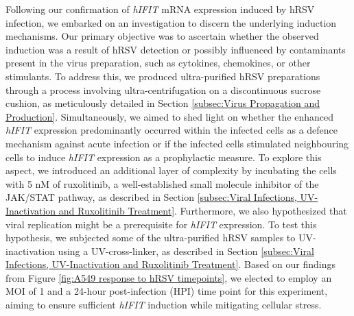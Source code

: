 Following our confirmation of \textit{hIFIT} mRNA expression induced by hRSV infection, we embarked on an investigation to discern the underlying induction mechanisms. Our primary objective was to ascertain whether the observed induction was a result of hRSV detection or possibly influenced by contaminants present in the virus preparation, such as cytokines, chemokines, or other stimulants. To address this, we produced ultra-purified hRSV preparations through a process involving ultra-centrifugation on a discontinuous sucrose cushion, as meticulously detailed in Section \ref{subsec:Virus Propagation and Production}. Simultaneously, we aimed to shed light on whether the enhanced \textit{hIFIT} expression predominantly occurred within the infected cells as a defence mechanism against acute infection or if the infected cells stimulated neighbouring cells to induce \textit{hIFIT} expression as a prophylactic measure. To explore this aspect, we introduced an additional layer of complexity by incubating the cells with 5 nM of ruxolitinib, a well-established small molecule inhibitor of the JAK/STAT pathway, as described in Section \ref{subsec:Viral Infections, UV-Inactivation and Ruxolitinib Treatment}. Furthermore, we also hypothesized that viral replication might be a prerequisite for \textit{hIFIT} expression. To test this hypothesis, we subjected some of the ultra-purified hRSV samples to UV-inactivation using a UV-cross-linker, as described in Section \ref{subsec:Viral Infections, UV-Inactivation and Ruxolitinib Treatment}. Based on our findings from Figure \ref{fig:A549 response to hRSV timepoints}, we elected to employ an MOI of 1 and a 24-hour post-infection (HPI) time point for this experiment, aiming to ensure sufficient \textit{hIFIT} induction while mitigating cellular stress.


